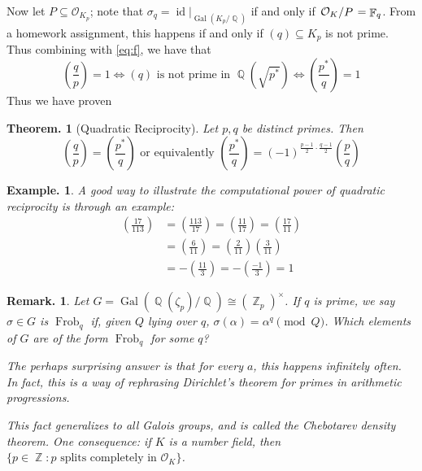 \documentclass[11pt, a4paper]{memoir}
\DeclareMathOperator{\Q}{{\mathbb{Q}}}
\DeclareMathOperator{\Z}{{\mathbb{Z}}}
\DeclareMathOperator{\F}{{\mathbb{F}}}
\theoremstyle{change}
\newtheorem{theorem}{Theorem.}[section]
\theoremstyle{plain}
\theoremstyle{nonumberplain}
\newtheorem{example}{Example.}
\newtheorem{remark}{Remark.}
\DeclareMathOperator{\Gal}{Gal}
\DeclareMathOperator{\id}{id}
\newcommand{\lgs}[2]{\ensuremath{\left(\frac{#1}{#2}\right)}}
\newcommand{\quot}[2]{\mathchoice{\left.\raisebox{0.07em}{$#1$}\middle/\raisebox{-0.07em}{$#2$}\right.}
                                 {\left.\raisebox{0.03em}{$#1$}\middle/\raisebox{-0.03em}{$#2$}\right.}
                                 {\left.\raisebox{0.00em}{$#1$}\middle/\raisebox{-0.00em}{$#2$}\right.}
                                 {\left.\raisebox{0em}{$#1$}\middle/\raisebox{0em}{$#2$}\right.}}
\DeclareMathOperator{\Frob}{Frob}
\numberwithin{equation}{section}
\begin{document}
Now let $P\subseteq\mathcal{O}_{K_p}$; note that $\sigma_q=\id|_{\Gal(K_p/\Q)}$ if and only if $\quot{\mathcal{O}_K}{P}=\F_q$.
From a homework assignment, this happens if and only if $(q)\subseteq K_p$ is not prime.
Thus combining with \cref{eq:f}, we have that
\begin{equation*}
    \lgs{q}{p}=1 \iff (q)\text{ is not prime in }\Q(\sqrt{p^*}) \iff \lgs{p^*}{q}=1
\end{equation*}
Thus we have proven
\begin{theorem}[Quadratic Reciprocity]
    Let $p,q$ be distinct primes.
    Then
    \begin{equation*}
        \lgs{q}{p}=\lgs{p^*}{q}\text{ or equivalently } \lgs{p^*}{q}=(-1)^{\frac{p-1}{2}\cdot\frac{q-1}{2}}\lgs{p}{q}
    \end{equation*}
\end{theorem}
\begin{example}
    A good way to illustrate the computational power of quadratic reciprocity is through an example:
    \begin{align*}
        \lgs{17}{113} &= \lgs{113}{17}= \lgs{11}{17}= \lgs{17}{11}\\
                      &=\lgs{6}{11}= \lgs{2}{11}\lgs{3}{11}\\
                      &= -\lgs{11}{3}=-\lgs{-1}{3}=1
    \end{align*}
\end{example}
\begin{remark}
    Let $G=\Gal(\Q(\zeta_p)/\Q)\cong(\Z_p)^\times$.
    If $q$ is prime, we say $\sigma\in G$ is $\Frob_q$ if, given $Q$ lying over $q$, $\sigma(\alpha)=\alpha^q\pmod{Q}$.
    Which elements of $G$ are of the form $\Frob_q$ for some $q$?

    The perhaps surprising answer is that for every $a$, this happens infinitely often.
    In fact, this is a way of rephrasing Dirichlet's theorem for primes in arithmetic progressions.

    This fact generalizes to all Galois groups, and is called the Chebotarev density theorem.
    One consequence: if $K$ is a number field, then $\{p\in\Z:p\text{ splits completely in }\mathcal{O}_K\}$.
\end{remark}
\end{document}
